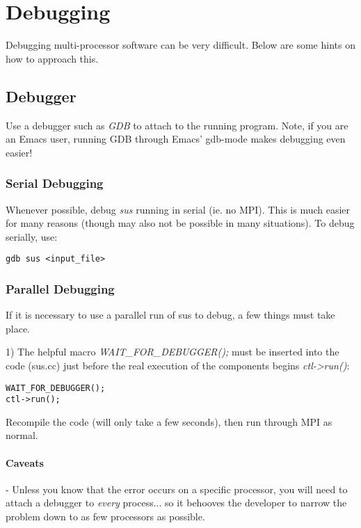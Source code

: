 \chapter{Debugging}

Debugging multi-processor software can be very difficult.  Below are
some hints on how to approach this.

\section{Debugger}

Use a debugger such as \emph{GDB} to attach to the running program.
Note, if you are an Emacs user, running GDB through Emacs' gdb-mode
makes debugging even easier!

\subsection{Serial Debugging}

Whenever possible, debug \emph{sus} running in serial (ie. no MPI).
This is much easier for many reasons (though may also not be possible
in many situations).  To debug serially, use:

\begin{lstlisting}
gdb sus <input_file>
\end{lstlisting}

\subsection{Parallel Debugging}

If it is necessary to use a parallel run of sus to debug, a few things
must take place.

1) The helpful macro {\em WAIT\_FOR\_DEBUGGER();} must be inserted into
the code (sus.cc) just before the real execution of the components
begins \emph{ctl->run()}:

\begin{lstlisting}
WAIT_FOR_DEBUGGER();
ctl->run();
\end{lstlisting}

Recompile the code (will only take a few seconds), then run through
MPI as normal.  


\subsubsection{Caveats}

- Unless you know that the error occurs on a specific processor, you will need to attach a debugger to \emph{every}
process... so it behooves the developer to narrow the problem down to
as few processors as possible.

